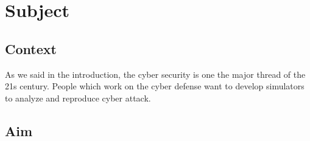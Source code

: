 
\chapter{Subject}

\section{Context}

As we said in the introduction, the cyber security is one the major thread of
the 21s century. People which work on the cyber defense want to develop
simulators to analyze and reproduce cyber attack.




\section{Aim}



